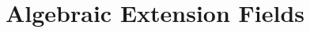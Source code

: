 \chapter{Algebraic Extension Fields}
\label{chapter:AlgebraicExtensions}
\thispagestyle{empty}





